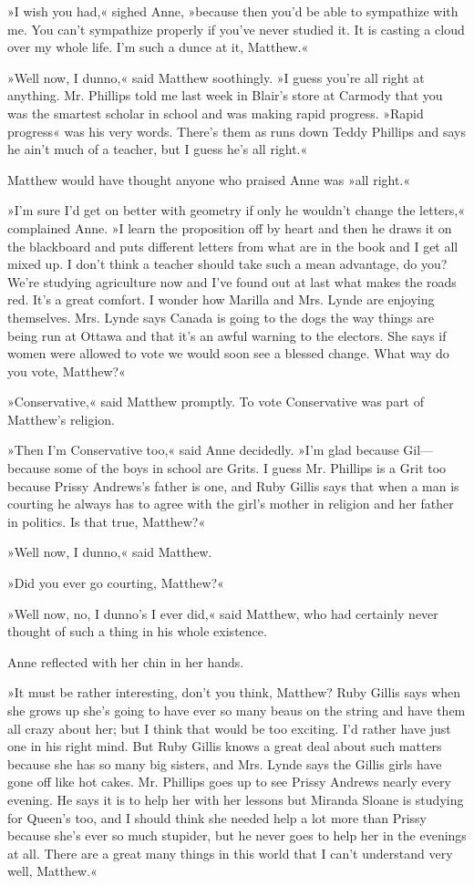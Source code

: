 »I wish you had,« sighed Anne, »because then you'd be able to sympathize with me. You can't sympathize properly if you've never studied it. It is casting a cloud over my whole life. I'm such a dunce at it, Matthew.«

»Well now, I dunno,« said Matthew soothingly. »I guess you're all right at anything. Mr. Phillips told me last week in Blair's store at Carmody that you was the smartest scholar in school and was making rapid progress. »Rapid progress« was his very words. There's them as runs down Teddy Phillips and says he ain't much of a teacher, but I guess he's all right.«

Matthew would have thought anyone who praised Anne was »all right.«

»I'm sure I'd get on better with geometry if only he wouldn't change the letters,« complained Anne. »I learn the proposition off by heart and then he draws it on the blackboard and puts different letters from what are in the book and I get all mixed up. I don't think a teacher should take such a mean advantage, do you? We're studying agriculture now and I've found out at last what makes the roads red. It's a great comfort. I wonder how Marilla and Mrs. Lynde are enjoying themselves. Mrs. Lynde says Canada is going to the dogs the way things are being run at Ottawa and that it's an awful warning to the electors. She says if women were allowed to vote we would soon see a blessed change. What way do you vote, Matthew?«

»Conservative,« said Matthew promptly. To vote Conservative was part of Matthew's religion.

»Then I'm Conservative too,« said Anne decidedly. »I'm glad because Gil—because some of the boys in school are Grits. I guess Mr. Phillips is a Grit too because Prissy Andrews's father is one, and Ruby Gillis says that when a man is courting he always has to agree with the girl's mother in religion and her father in politics. Is that true, Matthew?«

»Well now, I dunno,« said Matthew.

»Did you ever go courting, Matthew?«

»Well now, no, I dunno's I ever did,« said Matthew, who had certainly never thought of such a thing in his whole existence.

Anne reflected with her chin in her hands.

»It must be rather interesting, don't you think, Matthew? Ruby Gillis says when she grows up she's going to have ever so many beaus on the string and have them all crazy about her; but I think that would be too exciting. I'd rather have just one in his right mind. But Ruby Gillis knows a great deal about such matters because she has so many big sisters, and Mrs. Lynde says the Gillis girls have gone off like hot cakes. Mr. Phillips goes up to see Prissy Andrews nearly every evening. He says it is to help her with her lessons but Miranda Sloane is studying for Queen's too, and I should think she needed help a lot more than Prissy because she's ever so much stupider, but he never goes to help her in the evenings at all. There are a great many things in this world that I can't understand very well, Matthew.«

